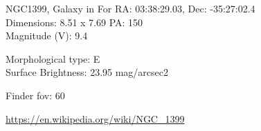 \begin{block}{NGC1399, Galaxy in For}
    RA: 03:38:29.03, Dec: -35:27:02.4 \\ 
    Dimensions: 8.51 x 7.69 PA: 150 \\ 
    Magnitude (V): 9.4

    Morphological type: E \\ 
    Surface Brightness: 23.95 mag/arcsec2 


    Finder fov: 60 

    \url{https://en.wikipedia.org/wiki/NGC_1399} 
\end{block}